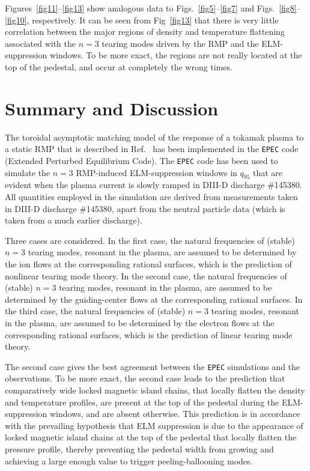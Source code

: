\documentclass[12pt,prb,aps]{revtex4-1}
\begin{document}
Figures~\ref{fig11}--\ref{fig13} show analogous data to Figs.~\ref{fig5}--\ref{fig7} and Figs.~\ref{fig8}--\ref{fig10}, respectively.  
It can be seen from Fig~\ref{fig13} that there is very little correlation between the major regions of density and temperature flattening associated
with the $n=3$ tearing modes driven by the RMP and the  ELM-suppression windows. To be more exact, the 
regions  are not really located at the top of the pedestal, and occur at completely the wrong times.  

\section{Summary and Discussion}
The toroidal asymptotic matching model of the response of a tokamak plasma to a static RMP that is described in Ref.~
has been implemented in the {\tt EPEC} code (Extended Perturbed Equilibrium Code). The {\tt EPEC} code has  been used to simulate the $n=3$ RMP-induced ELM-suppression
windows in $q_{95}$ that are evident when the plasma current is slowly ramped in DIII-D discharge \#145380. All quantities employed in the simulation are
derived from measurements taken in DIII-D discharge \#145380, apart from the neutral particle data (which is taken from a much earlier discharge).

Three cases are considered. In the first case, the natural frequencies of (stable) $n=3$ tearing modes, resonant in the plasma, are assumed to be
determined by the ion flows at the corresponding rational surfaces, which is the prediction of nonlinear tearing mode theory.\cite{nl1,nl2,nl3}
In the second case, the natural frequencies of (stable) $n=3$ tearing modes, resonant in the plasma, are assumed to be
determined by the guiding-center flows at the corresponding rational surfaces.\cite{heyn,paz1} 
In the third case, the natural frequencies of (stable) $n=3$ tearing modes, resonant in the plasma, are assumed to be
determined by the electron flows at the corresponding rational surfaces, which is the prediction of linear tearing mode theory.\cite{lin1,lin2,lin3}

The second case gives the best agreement between the {\tt EPEC} simulations and the  observations. To be more
exact, the second case leads to the prediction that comparatively wide locked magnetic island chains, that locally flatten the density and temperature profiles, 
 are present at the top of the pedestal during the ELM-suppression
windows, and are absent otherwise. This prediction is in accordance with the prevailing hypothesis that ELM suppression is due to the appearance of locked
magnetic island chains at the top of the pedestal that locally flatten the pressure profile, thereby preventing the pedestal width from growing and achieving a  
large enough value to trigger peeling-ballooning modes.\cite{d3d}
\end{document}
